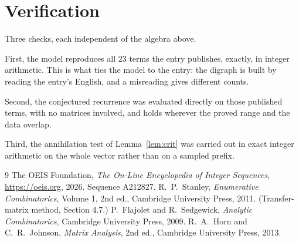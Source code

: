 \documentclass[11pt,a4paper]{article}
\theoremstyle{plain}
\theoremstyle{definition}
\begin{document}
\section{Verification}

Three checks, each independent of the algebra above.

First, the model reproduces all $23$ terms the entry publishes, exactly, in integer
arithmetic. This is what ties the model to the entry: the digraph is built by reading the
entry's English, and a misreading gives different counts.

Second, the conjectured recurrence was evaluated directly on those published terms, with no
matrices involved, and holds wherever the proved range and the data overlap.

Third, the annihilation test of Lemma~\ref{lem:crit} was carried out in exact integer
arithmetic on the whole vector rather than on a sampled prefix.

\begin{thebibliography}{9}
 The OEIS Foundation, \emph{The On-Line Encyclopedia of Integer
Sequences}, \url{https://oeis.org}, 2026. Sequence A212827.
 R.~P.~Stanley, \emph{Enumerative Combinatorics}, Volume 1, 2nd ed.,
Cambridge University Press, 2011. (Transfer-matrix method, Section 4.7.)
 P.~Flajolet and R.~Sedgewick, \emph{Analytic Combinatorics}, Cambridge
University Press, 2009.
 R.~A.~Horn and C.~R.~Johnson, \emph{Matrix Analysis}, 2nd ed., Cambridge
University Press, 2013.
\end{thebibliography}
\end{document}

